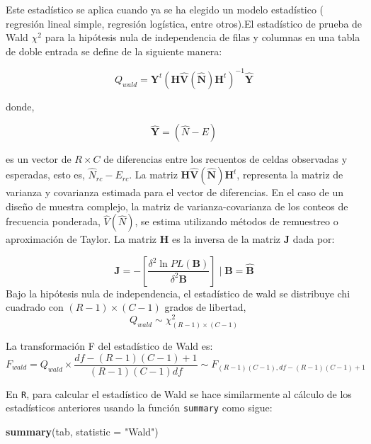\documentclass[
  12pt,
]{book}
\newenvironment{Shaded}{\begin{snugshade}}{\end{snugshade}}
\newcommand{\AttributeTok}[1]{\textcolor[rgb]{0.13,0.29,0.53}{#1}}
\newcommand{\FunctionTok}[1]{\textcolor[rgb]{0.13,0.29,0.53}{\textbf{#1}}}
\newcommand{\NormalTok}[1]{#1}
\newcommand{\StringTok}[1]{\textcolor[rgb]{0.31,0.60,0.02}{#1}}
\begin{document}
Este estadístico se aplica cuando ya se ha elegido un modelo estadístico ( regresión lineal simple, regresión logística, entre otros).El estadístico de prueba de Wald \(\chi^{2}\) para la hipótesis nula de independencia de filas y columnas en una tabla de doble entrada se define de la siguiente manera:

\[
Q_{wald}=\hat{\boldsymbol{Y}^{t}}\left(\boldsymbol{H}\hat{\boldsymbol{V}}\left(\hat{\boldsymbol{N}}\right)\boldsymbol{H}^{t}\right)^{-1}\hat{\boldsymbol{Y}}
\]

donde,

\[
\hat{\boldsymbol{Y}}=\left(\hat{N}-E\right)
\]

es un vector de \(R\times C\) de diferencias entre los recuentos de celdas observadas y esperadas, esto es, \(\hat{N}_{rc}-E_{rc}\). La matriz \(\boldsymbol{H}\hat{\boldsymbol{V}}\left(\hat{\boldsymbol{N}}\right)\boldsymbol{H}^{t}\), representa la matriz de varianza y covarianza estimada para el vector de diferencias. En el caso de un diseño de muestra complejo, la matriz de varianza-covarianza de los conteos de frecuencia ponderada, \(\hat{V}\left(\hat{N}\right)\), se estima utilizando métodos de remuestreo o aproximación de Taylor. La matriz \(\boldsymbol{H}\) es la inversa de la matriz \(\boldsymbol{J}\) dada por:

\[
\boldsymbol{J}=-\left[\frac{\delta^{2}\ln PL\left(\boldsymbol{B}\right)}{\delta^{2}\boldsymbol{B}}\right] \mid \boldsymbol{B}=\hat{\boldsymbol{B}}
\]
Bajo la hipótesis nula de independencia, el estadístico de wald se distribuye chi cuadrado con \(\left(R-1\right)\times\left(C-1\right)\) grados de libertad,
\[
Q_{wald}\sim\chi_{\left(R-1\right)\times\left(C-1\right)}^{2}
\]

La transformación F del estadístico de Wald es:
\[
F_{wald}=Q_{wald}\times\frac{df-\left(R-1\right)\left(C-1\right)+1}{\left(R-1\right)\left(C-1\right)df}\sim F_{\left(R-1\right)\left(C-1\right),df-\left(R-1\right)\left(C-1\right)+1}
\]

En \texttt{R}, para calcular el estadístico de Wald se hace similarmente al cálculo de los estadísticos anteriores usando la función \texttt{summary} como sigue:

\begin{Shaded}
\begin{Highlighting}[]
\FunctionTok{summary}\NormalTok{(tab, }\AttributeTok{statistic =} \StringTok{"Wald"}\NormalTok{)}
\end{Highlighting}
\end{Shaded}
\end{document}
